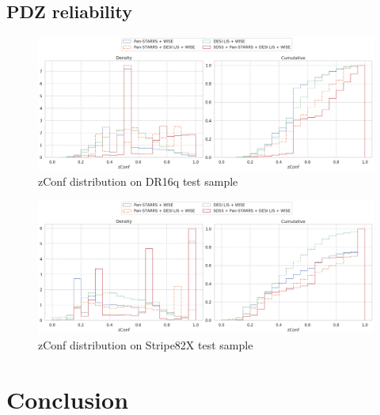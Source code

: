 \documentclass[fleqn,usenatbib]{mnras}
\begin{document}
\subsection{PDZ reliability}

\begin{figure}[ht]
    \centering
    \includegraphics[width=0.9\linewidth]{images/zconf-cal-dr16q.png}
    \caption{zConf distribution on DR16q test sample}
    \label{fig:zconf-cal-dr16q}
\end{figure}

\begin{figure}[ht]
    \centering
    \includegraphics[width=0.9\linewidth]{images/zconf-cal-stripe82X.png}
    \caption{zConf distribution on Stripe82X test sample}
    \label{fig:zconf-cal-stripe82X}
\end{figure}


\section{Conclusion}

\end{document}
